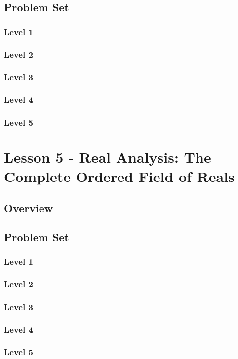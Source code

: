 \documentclass{article}
\begin{document}
\subsection{Problem Set}
\subsubsection{Level 1}
\subsubsection{Level 2}
\subsubsection{Level 3}
\subsubsection{Level 4}
\subsubsection{Level 5}
\pagebreak

\section{Lesson 5 - Real Analysis: The Complete Ordered Field of Reals}
\subsection{Overview}
\subsection{Problem Set}
\subsubsection{Level 1}
\subsubsection{Level 2}
\subsubsection{Level 3}
\subsubsection{Level 4}
\subsubsection{Level 5}
\pagebreak
\end{document}
